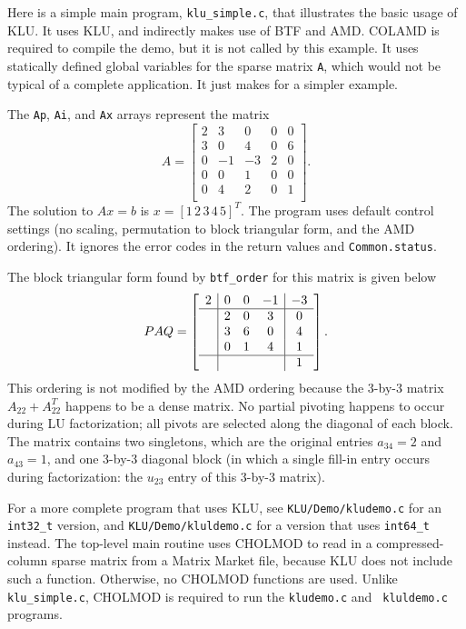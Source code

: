 \documentclass[11pt]{article}
\begin{document}
Here is a simple main program, {\tt klu\_simple.c}, that illustrates the basic
usage of KLU.  It uses KLU, and indirectly makes use of BTF and AMD.  COLAMD is
required to compile the demo, but it is not called by this example.  It uses
statically defined global variables for the sparse matrix {\tt A}, which would
not be typical of a complete application.  It just makes for a simpler example.

{\footnotesize

}

The {\tt Ap}, {\tt Ai}, and {\tt Ax} arrays represent the matrix
\[
A = \left[
\begin{array}{ccccc}
 2 &  3 &  0 &  0 &  0 \\
 3 &  0 &  4 &  0 &  6 \\
 0 & -1 & -3 &  2 &  0 \\
 0 &  0 &  1 &  0 &  0 \\
 0 &  4 &  2 &  0 &  1 \\
\end{array}
\right].
\]
The solution to $Ax=b$ is $x = [1 \, 2 \, 3 \, 4 \, 5]^T$.  The program
uses default control settings (no scaling, permutation to block triangular
form, and the AMD ordering).  It ignores the error codes in the return values
and {\tt Common.status}.

The block triangular form found by {\tt btf\_order} for this matrix is
given below
\[
PAQ = \left[
\begin{array}{c|ccc|c}
2 & 0 & 0 & -1 & -3 \\
\hline
  & 2 & 0 & 3 & 0 \\
  & 3 & 6 & 0 & 4 \\
  & 0 & 1 & 4 & 1 \\
\hline
  &   &   &   & 1 \\
\end{array}
\right].
\]
This ordering is not modified by the AMD ordering because the 3-by-3 matrix
$A_{22} + A_{22}^T$ happens to be a dense matrix.  No partial pivoting happens
to occur during LU factorization; all pivots are selected along the diagonal of
each block.  The matrix contains two singletons, which are the original entries
$a_{34}=2$ and $a_{43}=1$, and one 3-by-3 diagonal block (in which a single
fill-in entry occurs during factorization: the $u_{23}$ entry of this 3-by-3
matrix).

For a more complete program that uses KLU, see {\tt KLU/Demo/kludemo.c} for an
\verb'int32_t' version, and {\tt KLU/Demo/kluldemo.c} for a version that uses \verb'int64_t' instead.  The top-level main routine uses CHOLMOD to read in a
compressed-column sparse matrix from a Matrix Market file, because KLU does not
include such a function.  Otherwise, no CHOLMOD functions are used.  Unlike
{\tt klu\_simple.c}, CHOLMOD is required to run the {\tt kludemo.c} and {\tt
kluldemo.c} programs.
\end{document}
